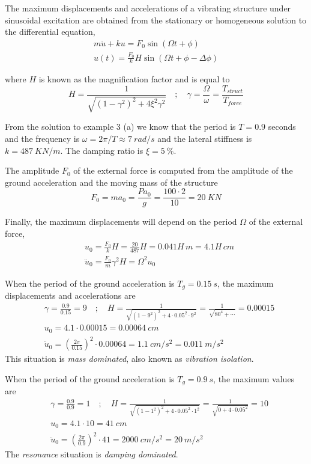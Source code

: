 \begin{Answer}[ref={frame_ground_acceleration}]
The maximum displacements and accelerations of a vibrating structure under sinusoidal excitation are obtained from the stationary or homogeneous solution to the differential equation,
\begin{align*}
m\ddot{u} + ku = F_0\sin(\Omega t + \phi) \\
u(t) = \frac{F_0}{k}H\sin(\Omega t + \phi - \Delta\phi)
\end{align*}

where $H$ is known as the magnification factor and is equal to
$$
H = \frac{1}{\sqrt{(1-\gamma^2)^2 + 4\xi^2\gamma^2}} \quad ; \quad
\gamma = \frac{\Omega}{\omega} = \frac{T_{struct}}{T_{force}}
$$

From the solution to example 3 (a) we know that the period is $T=0.9$ seconds and the frequency is $\omega = 2\pi/T \approx \SI{7}{rad/s}$ and the lateral stiffness is $k=\SI{487}{KN/m}$. The damping ratio is $\xi=\SI{5}{\%}$.

The amplitude $F_0$ of the external force is computed from the amplitude of the ground acceleration and the moving mass of the structure
$$
F_0 = ma_{0} = \frac{Pa_0}{g} = \frac{100\cdot2}{10} = \SI{20}{KN}
$$

Finally, the maximum displacements will depend on the period $\Omega$ of the external force,
\begin{align*}
&u_0 = \frac{F_0}{k}H = \frac{20}{487}H = 0.041H\,\si{m} = 4.1H\,\si{cm} \\
&\ddot{u}_0 = \frac{F_0}{m}\gamma^2H = \Omega^2u_0
\end{align*}


When the period of the ground acceleration is $T_g=\SI{0.15}{s}$, the maximum displacements and accelerations are
\begin{align*}
&\gamma = \frac{0.9}{0.15} = 9 \quad ; \quad
H = \frac{1}{\sqrt{(1-9^2)^2 + 4\cdot 0.05^2\cdot 9^2}} = \frac{1}{\sqrt{80^4 + \cdots}} = 0.00015 \\
&u_0 = 4.1\cdot 0.00015 = \SI{0.00064}{cm} \\
&\ddot{u}_0 = \left(\frac{2\pi}{0.15}\right)^2 \cdot 0.00064 = \SI{1.1}{cm/s^2} = \SI{0.011}{m/s^2}
\end{align*}
This situation is \emph{mass dominated}, also known as \emph{vibration isolation}.

When the period of the ground acceleration is $T_g=\SI{0.9}{s}$, the maximum values are
\begin{align*}
&\gamma = \frac{0.9}{0.9} = 1 \quad ; \quad
H = \frac{1}{\sqrt{(1-1^2)^2 + 4\cdot 0.05^2\cdot 1^2}} = \frac{1}{\sqrt{0 + 4\cdot 0.05^2}} = 10 \\
&u_0 = 4.1\cdot 10 = \SI{41}{cm} \\
&\ddot{u}_0 = \left(\frac{2\pi}{0.9}\right)^2 \cdot 41 = \SI{2000}{cm/s^2} = \SI{20}{m/s^2}
\end{align*}
The \emph{resonance} situation is \emph{damping dominated}.


\end{Answer}
